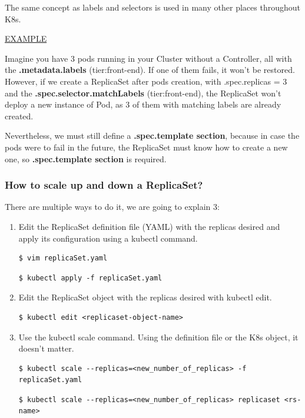 \documentclass{article}
\newenvironment{codetemplate}[1][]{%
  \mybasecolorbox[#1]
  \itshape
}{%
  \endmybasecolorbox
}
\begin{document}
The same concept as labels and selectors is used in many other places throughout K8s.

\underline{EXAMPLE}

Imagine you have 3 pods running in your Cluster without a Controller, all with the \textbf{.metadata.labels} (tier:front-end). If one of them fails, it won't be restored. However, if we create a ReplicaSet after pods creation, with .spec.replicas = 3 and the \textbf{.spec.selector.matchLabels}  (tier:front-end), the ReplicaSet won't deploy a new instance of Pod, as 3 of them with matching labels are already created.

Nevertheless, we must still define a \textbf{.spec.template section}, because in case the pods were to fail in the future, the ReplicaSet must know how to create a new one, so \textbf{.spec.template section} is required.

\subsubsection{How to scale up and down a ReplicaSet?}

There are multiple ways to do it, we are going to explain 3:

\begin{enumerate}
    \item Edit the ReplicaSet definition file (YAML) with the replicas desired and apply its configuration using a kubectl command.
\begin{codetemplate}{}
\begin{verbatim}
$ vim replicaSet.yaml
\end{verbatim}
\end{codetemplate}
\begin{codetemplate}{}
\begin{verbatim}
$ kubectl apply -f replicaSet.yaml
\end{verbatim}
\end{codetemplate}

    \item Edit the ReplicaSet object with the replicas desired with kubectl edit.
\begin{codetemplate}{}
\begin{verbatim}
$ kubectl edit <replicaset-object-name>
\end{verbatim}
\end{codetemplate}

    \item Use the kubectl scale command. Using the definition file or the K8s object, it doesn't matter.
\begin{codetemplate}{}
\begin{verbatim}
$ kubectl scale --replicas=<new_number_of_replicas> -f replicaSet.yaml
\end{verbatim}
\end{codetemplate}

\begin{codetemplate}{}
\begin{verbatim}
$ kubectl scale --replicas=<new_number_of_replicas> replicaset <rs-name>
\end{verbatim}
\end{codetemplate}
\end{enumerate}
\end{document}

